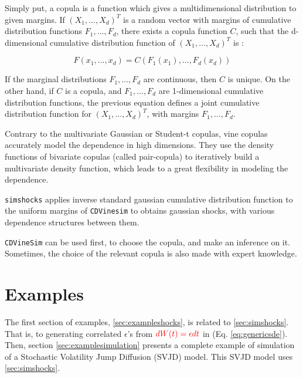 \documentclass[a4paper]{article}\usepackage[]{graphicx}\usepackage[]{color}
\newcommand{\code}[1]{\mbox{\texttt{#1}}}
\begin{document}
\medskip

Simply put, a copula is a function which gives a multidimensional distribution to given margins. If $(X_1, \ldots, X_d)^T$ is a random vector with margins of cumulative distribution functions $F_1, \ldots, F_d$, there exists a copula  function $C$, such that the d-dimensional cumulative distribution function of $(X_1, \ldots, X_d)^T$ is :

\begin{equation}
F(x_1, \ldots, x_d) = C(F_1(x_1), \ldots, F_d(x_d))
\end{equation}


If the marginal distributions $F_1, \ldots, F_d$ are continuous, then $C$ is unique. On the other hand, if $C$ is a copula, and $F_1, \ldots, F_d$ are 1-dimensional cumulative distribution functions, the previous equation defines a joint cumulative distribution function for $(X_1, \ldots, X_d)^T$, with margins $F_1, \ldots, F_d$.

\medskip

Contrary to the multivariate Gaussian or Student-t copulas, vine copulas accurately model the dependence in high dimensions. They use the density functions of bivariate copulas (called pair-copula) to iteratively build a multivariate density function, which leads to a great flexibility in modeling the dependence.  

\medskip

\code{simshocks} applies inverse standard gaussian cumulative distribution function to the uniform margins of \code{CDVinesim} to obtains gaussian shocks, with various dependence structures between them. 

\medskip

\code{CDVineSim} can be used first, to choose the copula, and make an inference on it. Sometimes, the choice of the relevant copula is also made with expert knowledge. 

\medskip

\section{Examples}
\label{sec:examples}

The first section of examples, \ref{sec:exampleshocks}, is related to \ref{sec:simshocks}. That is, to generating  correlated $\epsilon$'s from  $\textcolor{red}{dW(t) = \epsilon dt}$ in (Eq. \ref{eq:genericsde}). Then, section \ref{sec:examplesimulation} presents a complete example of simulation of  a Stochastic Volatility Jump Diffusion (SVJD) model. This SVJD model uses \ref{sec:simshocks}.
\end{document}
